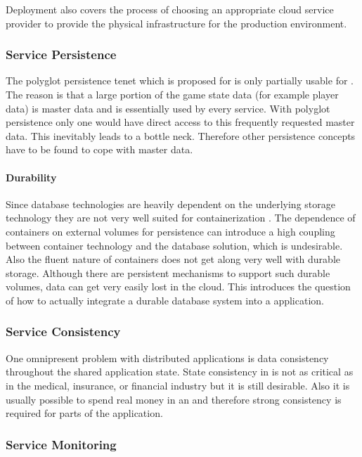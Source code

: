 Deployment also covers the process of choosing an appropriate cloud service
provider to provide the physical infrastructure for the production environment.

\subsubsection{Service Persistence}

The polyglot persistence tenet which is proposed for \mss{} is only partially
usable for \ogs{}. The reason is that a large portion of the game state data
(for example player data) is master data and is essentially used by every
service. With polyglot persistence only one \ms{} would have direct access to
this frequently requested master data. This inevitably leads to a bottle neck.
Therefore other persistence concepts have to be found to cope with master data.

\paragraph{Durability}

Since database technologies are heavily dependent on the underlying storage
technology they are not very well suited for containerization
\cite{cazorla2017db_containers}. The dependence of containers on external
volumes for persistence can introduce a high coupling between container
technology and the database solution, which is undesirable. Also the fluent
nature of containers does not get along very well with durable storage. Although
there are persistent mechanisms to support such durable volumes, data can get
very easily lost in the cloud. This introduces the question of how to actually
integrate a durable database system into a \ms{} application.

\subsubsection{Service Consistency}

One omnipresent problem with distributed applications is data consistency
throughout the shared application state. State consistency in \ogs{} is not
as critical as in the medical, insurance, or financial industry but it is still
desirable. Also it is usually possible to spend real money in an \og{} and
therefore strong consistency is required for parts of the application.

\subsubsection{Service Monitoring}

